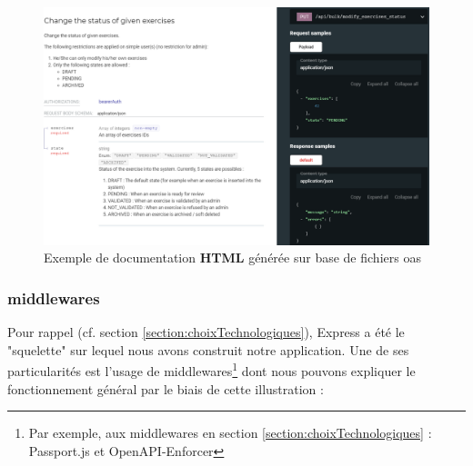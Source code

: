 \begin{figure}[H]
    \includegraphics[width=\textwidth,height=0.44\textheight,keepaspectratio]{images/serveur/doc_example.png}
    \centering
    \caption{Exemple de documentation \textbf{HTML} générée sur base de fichiers \Gls{oas}}
    \label{fig:exampleDoc}
\end{figure}

\pagebreak
\subsubsection{\Glspl{middleware}}

Pour rappel (cf. section \ref{section:choixTechnologiques}), Express a été le "squelette" sur lequel nous avons construit notre application.
Une de ses particularités est l'usage de \glspl{middleware}\footnote{
    Par exemple, aux \glspl{middleware} en section \ref{section:choixTechnologiques} : Passport.js et OpenAPI-Enforcer
} dont nous pouvons expliquer le fonctionnement général par le biais de cette illustration :

